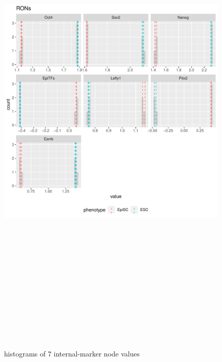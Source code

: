 \documentclass[
]{book}
\begin{document}
\begin{figure}[H]

{\centering \includegraphics[width=460pt,height=700pt]{ipsc/results/expanded-experimental_internalmarkers} 

}

\caption{histograms of 7 internal-marker node values}\label{fig:unnamed-chunk-30}
\end{figure}
\end{document}
